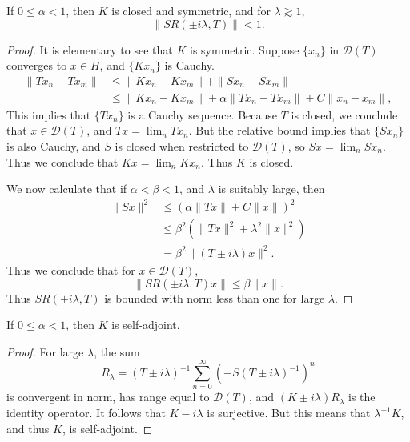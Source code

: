 \begin{lemma}
    If $0 \leq \alpha < 1$, then $K$ is closed and symmetric, and for $\lambda \gtrsim 1$,
    \[ \| S R(\pm i\lambda,T) \| < 1. \]
\end{lemma}
\begin{proof}
    It is elementary to see that $K$ is symmetric. Suppose $\{ x_n \}$ in $\mathcal{D}(T)$ converges to $x \in H$, and $\{ Kx_n \}$ is Cauchy.
    \begin{align*}
        \| Tx_n - Tx_m \| &\leq \| Kx_n - Kx_m \| + \| Sx_n - Sx_m \|\\
        &\leq \| Kx_n - Kx_m \| + \alpha \| Tx_n - Tx_m \| + C \| x_n - x_m \|,
    \end{align*}
    This implies that $\{ Tx_n \}$ is a Cauchy sequence. Because $T$ is closed, we conclude that $x \in \mathcal{D}(T)$, and $Tx = \lim_n Tx_n$. But the relative bound implies that $\{ Sx_n \}$ is also Cauchy, and $S$ is closed when restricted to $\mathcal{D}(T)$, so $Sx = \lim_n Sx_n$. Thus we conclude that $Kx = \lim_n Kx_n$. Thus $K$ is closed.

    We now calculate that if $\alpha < \beta < 1$, and $\lambda$ is suitably large, then
    \begin{align*}
        \| Sx \|^2 &\leq \left( \alpha \| Tx \| + C \| x \| \right)^2\\
        &\leq \beta^2 ( \| Tx \|^2 + \lambda^2 \| x \|^2)\\
        &= \beta^2 \| (T \pm i \lambda) x \|^2.
    \end{align*}
    Thus we conclude that for $x \in \mathcal{D}(T)$,
    \[ \| S R(\pm i \lambda, T) x \| \leq \beta \| x \|. \]
    Thus $S R(\pm i \lambda, T)$ is bounded with norm less than one for large $\lambda$.
\end{proof}

\begin{theorem}
    If $0 \leq \alpha < 1$, then $K$ is self-adjoint.
\end{theorem}
\begin{proof}
    For large $\lambda$, the sum
    \[ R_\lambda = (T \pm i \lambda)^{-1} \sum_{n = 0}^\infty (- S (T \pm i \lambda)^{-1} )^n \]
    is convergent in norm, has range equal to $\mathcal{D}(T)$, and $(K \pm i \lambda) R_\lambda$ is the identity operator. It follows that $K - i \lambda$ is surjective. But this means that $\lambda^{-1} K$, and thus $K$, is self-adjoint.
\end{proof}



